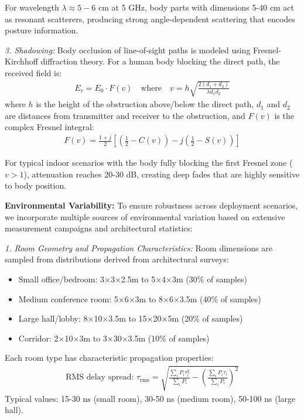 \documentclass[journal]{IEEEtran}
\begin{document}
For wavelength $\lambda \approx 5-6$ cm at 5 GHz, body parts with dimensions 5-40 cm act as resonant scatterers, producing strong angle-dependent scattering that encodes posture information.

\textit{3. Shadowing:} Body occlusion of line-of-sight paths is modeled using Fresnel-Kirchhoff diffraction theory. For a human body blocking the direct path, the received field is:
\begin{align}
E_r = E_0 \cdot F(v) \quad \text{where} \quad v = h\sqrt{\frac{2(d_1 + d_2)}{\lambda d_1 d_2}}
\end{align}
where $h$ is the height of the obstruction above/below the direct path, $d_1$ and $d_2$ are distances from transmitter and receiver to the obstruction, and $F(v)$ is the complex Fresnel integral:
\begin{align}
F(v) = \frac{1+j}{2} \left[ \left(\frac{1}{2} - C(v)\right) - j\left(\frac{1}{2} - S(v)\right) \right]
\end{align}

For typical indoor scenarios with the body fully blocking the first Fresnel zone ($v > 1$), attenuation reaches 20-30 dB, creating deep fades that are highly sensitive to body position.

\textbf{Environmental Variability:} To ensure robustness across deployment scenarios, we incorporate multiple sources of environmental variation based on extensive measurement campaigns and architectural statistics:

\textit{1. Room Geometry and Propagation Characteristics:}
Room dimensions are sampled from distributions derived from architectural surveys:
\begin{itemize}
\item Small office/bedroom: 3×3×2.5m to 5×4×3m (30\% of samples)
\item Medium conference room: 5×6×3m to 8×6×3.5m (40\% of samples)  
\item Large hall/lobby: 8×10×3.5m to 15×20×5m (20\% of samples)
\item Corridor: 2×10×3m to 3×30×3.5m (10\% of samples)
\end{itemize}

Each room type has characteristic propagation properties:
\begin{align}
\text{RMS delay spread: } \tau_{\text{rms}} = \sqrt{\frac{\sum_i P_i \tau_i^2}{\sum_i P_i} - \left(\frac{\sum_i P_i \tau_i}{\sum_i P_i}\right)^2}
\end{align}
Typical values: 15-30 ns (small room), 30-50 ns (medium room), 50-100 ns (large hall).
\end{document}
